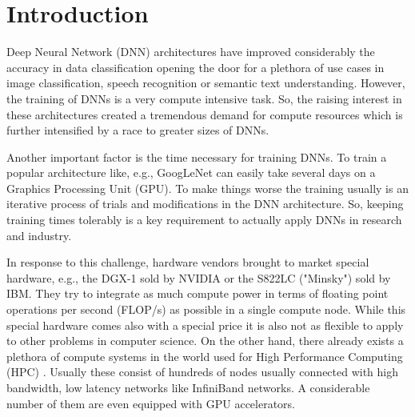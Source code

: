 \documentclass[twoside,twocolumn]{article}
\begin{document}
\maketitle



\section{Introduction}

Deep Neural Network (DNN) architectures have improved considerably
the accuracy in data classification opening the door for a plethora
of use cases  in image classification, speech recognition or semantic
text understanding. However, the training of DNNs is a very compute
intensive task. So, the raising interest in these architectures
created a tremendous demand for compute resources which is further 
intensified by a race to greater sizes of DNNs.

Another important factor is the time necessary for training DNNs.
To train a  popular architecture like, e.g., GoogLeNet can easily 
take several days on a Graphics Processing Unit (GPU). 
To make things worse the training usually is
an iterative process of trials and  modifications in the
DNN architecture. So, keeping training times tolerably is a key
requirement to actually apply DNNs in research and industry.

In response to this challenge, hardware vendors brought to market
special hardware, e.g., the DGX-1 sold by NVIDIA or the 
S822LC ("Minsky") sold by IBM. They try to integrate as much compute power
in terms of floating point operations per second (FLOP/s) as possible
in a single compute node. While this special hardware comes also with a
special price it is also not as flexible to apply to other problems
in computer science. On the other hand, there already exists a
plethora of compute systems in the world used for High Performance Computing
 (HPC) \cite{top500}. Usually these consist of hundreds of nodes usually
connected with high bandwidth, low latency networks like InfiniBand
networks. A considerable number of them are even equipped with
GPU accelerators.
\end{document}
